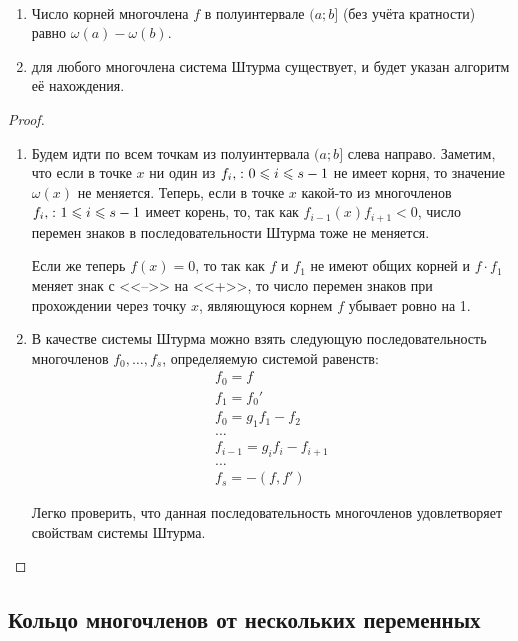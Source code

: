\begin{theorem}[Штурма]\par\strut\\
  \begin{enumerate}
    \item Число корней многочлена $f$ в полуинтервале $(a;b]$ (без учёта кратности) равно $\omega(a)-\omega(b)$.
    \item для любого многочлена система Штурма существует, и будет указан алгоритм её нахождения.
  \end{enumerate}
\end{theorem}
\begin{proof}\par\strut\\
  \begin{enumerate}
    \item Будем идти по всем точкам из полуинтервала $(a;b]$ слева направо. Заметим, что если в точке $x$ ни один из $f_i,\spc 0\bw\le i\bw\le s-1$ не имеет корня, то значение $\omega(x)$ не меняется. Теперь, если в точке $x$ какой-то из многочленов $f_i,\spc 1\bw\le i\bw\le s-1$ имеет корень, то, так как $f_{i-1}(x)f_{i+1}<0$, число перемен знаков в последовательности Штурма тоже не меняется.
    
    Если же теперь $f(x)=0$, то так как $f$ и $f_1$ не имеют общих корней и $f\cdot f_1$ меняет знак с <<-->> на <<+>>, то число перемен знаков при прохождении через точку $x$, являющуюся корнем $f$ убывает ровно на 1.
    \item В качестве системы Штурма можно взять следующую последовательность многочленов $f_0,\dots,f_s$, определяемую системой равенств:
    \begin{gather*}
      f_0 = f\\
      f_1 = f_0'\\
      f_0 = g_1f_1 - f_2\\
      \dots\\
      f_{i-1} = g_if_i - f_{i+1}\\
      \dots\\
      f_s = - (f,f')
    \end{gather*}
    
    Легко проверить, что данная последовательность многочленов удовлетворяет свойствам системы Штурма.
  \end{enumerate}
\end{proof}

\subsection{Кольцо многочленов от нескольких переменных}

